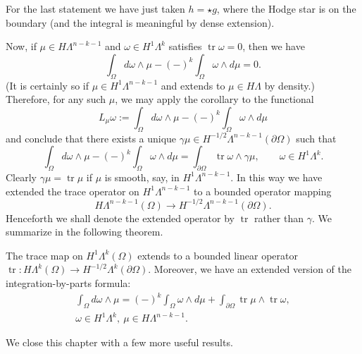 {For the last statement we have just taken $h=\star g$, where the Hodge star is on the boundary (and the integral is meaningful by dense extension).}

{Now, if $\mu\in H\Lambda^{n-k-1}$ and $\omega\in H^1\Lambda^k$ satisfies $\operatorname{tr}\omega=0$, then we have}
\[
\int_\Omega d\omega\wedge\mu-(-)^k\int_\Omega\omega\wedge d\mu=0.
\]
{(It is certainly so if $\mu\in H^1\Lambda^{n-k-1}$ and extends to $\mu\in H\Lambda$ by density.) Therefore, for any such $\mu$, we may apply the corollary to the functional}
\[
L_\mu\omega:=\int_\Omega d\omega\wedge\mu-(-)^k\int_\Omega\omega\wedge d\mu
\]
{and conclude that there exists a unique $\gamma\mu\in H^{-1/2}\Lambda^{n-k-1}(\partial\Omega)$ such that}
\[
\int_\Omega d\omega\wedge\mu-(-)^k\int_\Omega\omega\wedge d\mu=\int_{\partial\Omega}\operatorname{tr}\omega\wedge\gamma\mu,\qquad\omega\in H^1\Lambda^k.
\]
{Clearly $\gamma\mu=\operatorname{tr}\mu$ if $\mu$ is smooth, say, in $H^1\Lambda^{n-k-1}$. In this way we have extended the trace operator on $H^1\Lambda^{n-k-1}$ to a bounded operator mapping}
\[
H\Lambda^{n-k-1}(\Omega)\to H^{-1/2}\Lambda^{n-k-1}(\partial\Omega).
\]
{Henceforth we shall denote the extended operator by $\operatorname{tr}$ rather than $\gamma$. We summarize in the following theorem.}

\begin{Theorem}\label{thm:forms-weak-trace-extension}
{The trace map on $H^1\Lambda^k(\Omega)$ extends to a bounded linear operator $\operatorname{tr}:H\Lambda^k(\Omega)\to H^{-1/2}\Lambda^k(\partial\Omega)$. Moreover, we have an extended version of the integration-by-parts formula:}
\begin{equation}\label{eq:forms-extended-integration-by-parts}
\begin{gathered}
\int_\Omega d\omega\wedge\mu=(-)^k\int_\Omega\omega\wedge d\mu+\int_{\partial\Omega}\operatorname{tr}\mu\wedge\operatorname{tr}\omega,\\
\omega\in H^1\Lambda^k,\ \mu\in H\Lambda^{n-k-1}.
\end{gathered}
\end{equation}
\end{Theorem}

{We close this chapter with a few more useful results.}

